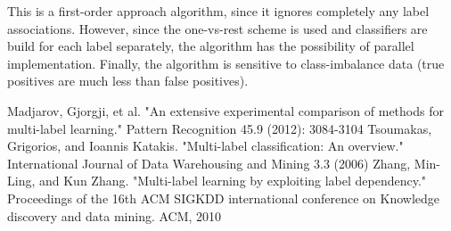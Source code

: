 \documentclass[12pt]{report}
\begin{document}
	This is a first-order approach algorithm, since it ignores completely any label associations. However, since the one-vs-rest scheme is used and classifiers are build for each label separately, the algorithm has the possibility of parallel implementation. Finally, the algorithm is sensitive to class-imbalance data (true positives are much less than false positives).
	\newpage
	\begin{thebibliography}{10}
		Madjarov, Gjorgji, et al. "An extensive experimental comparison of methods for multi-label learning." Pattern Recognition 45.9 (2012): 3084-3104
		 Tsoumakas, Grigorios, and Ioannis Katakis. "Multi-label classification: An overview." International Journal of Data Warehousing and Mining 3.3 (2006)
		 Zhang, Min-Ling, and Kun Zhang. "Multi-label learning by exploiting label dependency." Proceedings of the 16th ACM SIGKDD international conference on Knowledge discovery and data mining. ACM, 2010
	\end{thebibliography}
\end{document}
